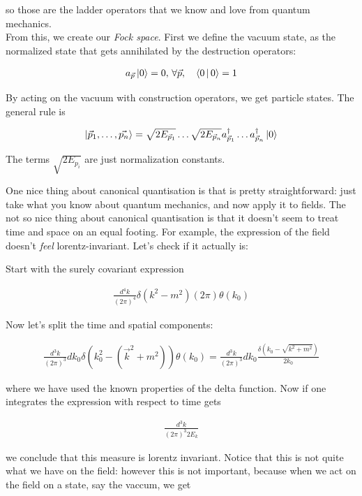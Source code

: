 \documentclass{report}
\begin{document}
so those are the ladder operators that we know and love from quantum mechanics. \\

From this, we create our \emph{Fock space}. First we define the vacuum state, as the normalized state that gets annihilated by the destruction operators: 

\begin{align}
    a_{\vec{p}}\ket{0} = 0, \, \forall \vec{p}, \quad \Braket{0 | 0} = 1
\end{align}

By acting on the vacuum with construction operators, we get particle states. The general rule is 

\begin{align}
    \ket{\vec{p}_1, \ldots, \vec{p_n}} = \sqrt{2E_{\vec{p}_1}}\ldots\sqrt{2E_{\vec{p}_n}}a^{\dagger}_{\vec{p}_1}\ldots a^{\dagger}_{\vec{p}_n}\ket{0}
\end{align}

The terms \(\sqrt{2E_{p_i}}\) are just normalization constants. 


One nice thing about canonical quantisation is that is pretty straightforward: just take what you know about quantum mechanics, and now apply it to fields. The not so nice thing about canonical quantisation is that it doesn't seem to treat time and space on an equal footing. For example, the expression of the field doesn't \emph{feel} lorentz-invariant. Let's check if it actually is: 

Start with the surely covariant expression 

\begin{align}
    \frac{d^4k}{(2\pi)^4}\delta(k^2-m^2)(2\pi)\theta(k_0)
\end{align}

Now let's split the time and spatial components: 

\begin{align}
    \frac{d^3k}{(2\pi)^3}dk_0 \delta(k_0^2 - (\vec{k}^2 + m^2))\theta(k_0) = \frac{d^3k}{(2\pi)^3}dk_0 \frac{\delta(k_0 - \sqrt{k^2 +m^2})}{2k_0}
\end{align}

where we have used the known properties of the delta function. Now if one integrates the expression with respect to time gets 

\begin{align}
    \frac{d^3k}{(2\pi)^3 2E_k}
\end{align}

we conclude that this measure is lorentz invariant. Notice that this is not quite what we have on the field: however this is not important, because when we act on the field on a state, say the vaccum, we get 
\end{document}
